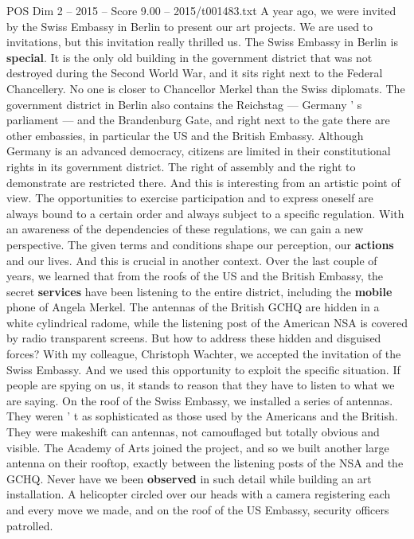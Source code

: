 \begin{textsample}{POS Dim 2 – 2015 – Score 9.00 – 2015/t001483.txt}  \label{ex:f2_pos_059}
A year ago, we were invited by the Swiss Embassy in Berlin to present our art projects.
We are used to invitations, but this invitation really thrilled us.
The Swiss Embassy in Berlin is \textbf{special}.
It is the only old building in the government district that was not destroyed during the Second World War, and it sits right next to the Federal Chancellery.
No one is closer to Chancellor Merkel than the Swiss diplomats.
The government district in Berlin also contains the Reichstag — Germany ' s parliament — and the Brandenburg Gate, and right next to the gate there are other embassies, in particular the US and the British Embassy.
Although Germany is an advanced democracy, citizens are limited in their constitutional rights in its government district.
The right of assembly and the right to demonstrate are restricted there.
And this is interesting from an artistic point of view.
The opportunities to exercise participation and to express oneself are always bound to a certain order and always subject to a specific regulation.
With an awareness of the dependencies of these regulations, we can gain a new perspective.
The given terms and conditions shape our perception, our \textbf{actions} and our lives.
And this is crucial in another context.
Over the last couple of years, we learned that from the roofs of the US and the British Embassy, the secret \textbf{services} have been listening to the entire district, including the \textbf{mobile} phone of Angela Merkel.
The antennas of the British GCHQ are hidden in a white cylindrical radome, while the listening post of the American NSA is covered by radio transparent screens.
But how to address these hidden and disguised forces?
With my colleague, Christoph Wachter, we accepted the invitation of the Swiss Embassy.
And we used this opportunity to exploit the specific situation.
If people are spying on us, it stands to reason that they have to listen to what we are saying.
On the roof of the Swiss Embassy, we installed a series of antennas.
They weren ' t as sophisticated as those used by the Americans and the British.
They were makeshift can antennas, not camouflaged but totally obvious and visible.
The Academy of Arts joined the project, and so we built another large antenna on their rooftop, exactly between the listening posts of the NSA and the GCHQ.
Never have we been \textbf{observed} in such detail while building an art installation.
A helicopter circled over our heads with a camera registering each and every move we made, and on the roof of the US Embassy, security officers patrolled.

\end{textsample}
